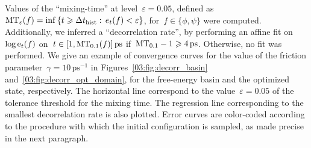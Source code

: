 Values of the ``mixing-time'' at level~$\varepsilon=0.05$, defined as~$\mathrm{MT}_{\varepsilon}(f) = \inf\,\{t\geqslant \Delta t_{\mathrm{hist}}:\, e_t(f)<\varepsilon\}$, for~$f\in\{\phi,\psi\}$ were computed. Additionally, we inferred a ``decorrelation rate'', by performing an affine fit on~$\log\mathrm{e}_t(f)$ on~$t\in [1,\mathrm{MT}_{0.1}(f)]\,\mathrm{ps}$ if~$\mathrm{MT}_{0.1}-1\geqslant 4\,\mathrm{ps}$. Otherwise, no fit was performed.
We give an example of convergence curves for the value of the friction parameter~$\gamma = 10\,\mathrm{ps}^{-1}$ in Figures~\ref{03:fig:decorr_basin} and~\ref{03:fig:decorr_opt_domain}, for the free-energy basin and the optimized state, respectively. The horizontal line correspond to the value~$\varepsilon=0.05$ of the tolerance threshold for the mixing time. The regression line corresponding to the smallest decorrelation rate is also plotted. Error curves are color-coded according to the procedure with which the initial configuration is sampled, as made precise in the next paragraph.
